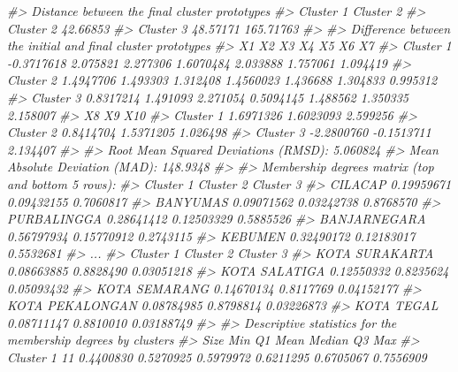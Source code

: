 \documentclass[
  oneside]{book}
\newenvironment{Shaded}{\begin{snugshade}}{\end{snugshade}}
\newcommand{\CommentTok}[1]{\textcolor[rgb]{0.56,0.35,0.01}{\textit{#1}}}
\begin{document}
\begin{Shaded}
\begin{Highlighting}[]
\CommentTok{\#\textgreater{} Distance between the final cluster prototypes}
\CommentTok{\#\textgreater{}           Cluster 1 Cluster 2}
\CommentTok{\#\textgreater{} Cluster 2  42.66853          }
\CommentTok{\#\textgreater{} Cluster 3  48.57171 165.71763}
\CommentTok{\#\textgreater{} }
\CommentTok{\#\textgreater{} Difference between the initial and final cluster prototypes}
\CommentTok{\#\textgreater{}                   X1       X2       X3        X4       X5       X6       X7}
\CommentTok{\#\textgreater{} Cluster 1 {-}0.3717618 2.075821 2.277306 1.6070484 2.033888 1.757061 1.094419}
\CommentTok{\#\textgreater{} Cluster 2  1.4947706 1.493303 1.312408 1.4560023 1.436688 1.304833 0.995312}
\CommentTok{\#\textgreater{} Cluster 3  0.8317214 1.491093 2.271054 0.5094145 1.488562 1.350335 2.158007}
\CommentTok{\#\textgreater{}                   X8         X9      X10}
\CommentTok{\#\textgreater{} Cluster 1  1.6971326  1.6023093 2.599256}
\CommentTok{\#\textgreater{} Cluster 2  0.8414704  1.5371205 1.026498}
\CommentTok{\#\textgreater{} Cluster 3 {-}2.2800760 {-}0.1513711 2.134407}
\CommentTok{\#\textgreater{} }
\CommentTok{\#\textgreater{} Root Mean Squared Deviations (RMSD): 5.060824 }
\CommentTok{\#\textgreater{} Mean Absolute Deviation (MAD): 148.9348 }
\CommentTok{\#\textgreater{} }
\CommentTok{\#\textgreater{} Membership degrees matrix (top and bottom 5 rows): }
\CommentTok{\#\textgreater{}               Cluster 1  Cluster 2 Cluster 3}
\CommentTok{\#\textgreater{} CILACAP      0.19959671 0.09432155 0.7060817}
\CommentTok{\#\textgreater{} BANYUMAS     0.09071562 0.03242738 0.8768570}
\CommentTok{\#\textgreater{} PURBALINGGA  0.28641412 0.12503329 0.5885526}
\CommentTok{\#\textgreater{} BANJARNEGARA 0.56797934 0.15770912 0.2743115}
\CommentTok{\#\textgreater{} KEBUMEN      0.32490172 0.12183017 0.5532681}
\CommentTok{\#\textgreater{} ...}
\CommentTok{\#\textgreater{}                  Cluster 1 Cluster 2  Cluster 3}
\CommentTok{\#\textgreater{} KOTA SURAKARTA  0.08663885 0.8828490 0.03051218}
\CommentTok{\#\textgreater{} KOTA SALATIGA   0.12550332 0.8235624 0.05093432}
\CommentTok{\#\textgreater{} KOTA SEMARANG   0.14670134 0.8117769 0.04152177}
\CommentTok{\#\textgreater{} KOTA PEKALONGAN 0.08784985 0.8798814 0.03226873}
\CommentTok{\#\textgreater{} KOTA TEGAL      0.08711147 0.8810010 0.03188749}
\CommentTok{\#\textgreater{} }
\CommentTok{\#\textgreater{} Descriptive statistics for the membership degrees by clusters}
\CommentTok{\#\textgreater{}           Size       Min        Q1      Mean    Median        Q3       Max}
\CommentTok{\#\textgreater{} Cluster 1   11 0.4400830 0.5270925 0.5979972 0.6211295 0.6705067 0.7556909}

\end{Highlighting}
\end{Shaded}
\end{document}
